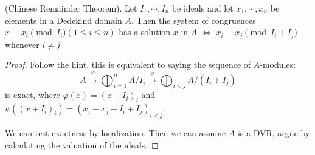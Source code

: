 \documentclass{solution}
\begin{document}
\begin{problem}
    (Chinese Remainder Theorem). Let $I_1, \cdots, I_n$ be ideals and let $x_1, \cdots, x_n$ be elements in a Dedekind domain $A$. Then the system of congruences $x \equiv x_i \pmod {I_i}(1 \le i \le n)$ has a solution $x$ in $A$ $\Leftrightarrow$ $x_i \equiv x_j \pmod{I_i + I_j}$ whenever $i \ne j$
\end{problem}

\begin{proof}
    Follow the hint, this is equivalent to saying the sequence of $A$-modules:
    $$A \xrightarrow{\varphi} \bigoplus_{i = 1}^n A / I_i \xrightarrow{\psi} \bigoplus_{i \lt j} A / (I_i + I_j)$$
    is exact, where $\varphi(x) = (x + I_i)_{i}$ and $\psi((x + I_i)_i) = (x_i - x_j + I_i + I_j)_{i \lt j}$.

    We can test exactness by localization. Then we can assume $A$ is a DVR, argue by calculating the valuation of the ideals.
\end{proof}
\end{document}
